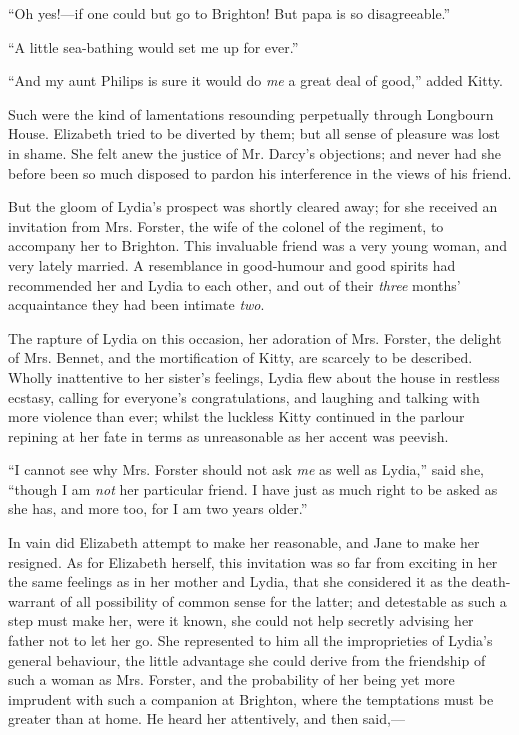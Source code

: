 ``Oh yes!---if one could but go to Brighton! But papa is so disagreeable.''

``A little sea-bathing would set me up for ever.''

``And my aunt Philips is sure it would do \textit{me} a great deal of good,'' added Kitty.

Such were the kind of lamentations resounding perpetually through Longbourn House. Elizabeth tried to be diverted by them; but all sense of pleasure was lost in shame. She felt anew the justice of Mr. Darcy's objections; and never had she before been so much disposed to pardon his interference in the views of his friend.

But the gloom of Lydia's prospect was shortly cleared away; for she received an invitation from Mrs. Forster, the wife of the colonel of the regiment, to accompany her to Brighton. This invaluable friend was a very young woman, and very lately married. A resemblance in good-humour and good spirits had recommended her and Lydia to each other, and out of their \textit{three} months' acquaintance they had been intimate \textit{two}.

The rapture of Lydia on this occasion, her adoration of Mrs. Forster, the delight of Mrs. Bennet, and the mortification of Kitty, are scarcely to be described. Wholly inattentive to her sister's feelings, Lydia flew about the house in restless ecstasy, calling for everyone's congratulations, and laughing and talking with more violence than ever; whilst the luckless Kitty continued in the parlour repining at her fate in terms as unreasonable as her accent was peevish.

``I cannot see why Mrs. Forster should not ask \textit{me} as well as Lydia,'' said she, ``though I am \textit{not} her particular friend. I have just as much right to be asked as she has, and more too, for I am two years older.''

In vain did Elizabeth attempt to make her reasonable, and Jane to make her resigned. As for Elizabeth herself, this invitation was so far from exciting in her the same feelings as in her mother and Lydia, that she considered it as the death-warrant of all possibility of common sense for the latter; and detestable as such a step must make her, were it known, she could not help secretly advising her father not to let her go. She represented to him all the improprieties of Lydia's general behaviour, the little advantage she could derive from the friendship of such a woman as Mrs. Forster, and the probability of her being yet more imprudent with such a companion at Brighton, where the temptations must be greater than at home. He heard her attentively, and then said,---

